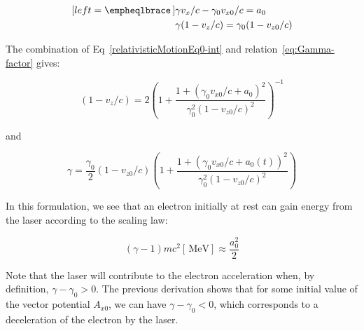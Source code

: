 \begin{subequations}
\label{relativisticMotionEq0-int}
\begin{align}[left = \empheqlbrace\,]
&\gamma v_x/c -\gamma_0 v_{x0}/c = a_0 \label{relativisticMotionEq0-1} \\
&\gamma (1 - v_z/c) =\gamma_0 (1 - v_{z0}/c ) \label{relativisticMotionEq0-3} 
\end{align}
\end{subequations}

\noindent The combination of Eq~\ref{relativisticMotionEq0-int} and relation~\ref{eq:Gamma-factor} gives:



\begin{equation}
(1 -v_z/c) = 2(1 + \frac{1+ (\gamma_0 v_{x0}/c + a_0)^2}{\gamma_0^2(1 - v_{z0}/c )^2})^{-1}
\end{equation}

\noindent and 

\begin{equation}
\gamma = \frac{\gamma_0}{2}(1 - v_{z0}/c )(1 + \frac{1+ (\gamma_0 v_{x0}/c + a_0(t))^2}{\gamma_0^2(1 - v_{z0}/c )^2})
\end{equation}


\noindent In this formulation, we see that an electron initially at rest can gain energy from the laser according to the scaling law:

$$
(\gamma -1)m c^2 [\,\mathrm{MeV}]  \approx  \frac{a_0^2}{2} 
$$

\noindent Note that the laser will contribute to the electron acceleration when, by definition, $\gamma - \gamma_0 > 0$. The previous derivation shows that for some initial value of the vector potential $A_{x0}$, we can have $\gamma - \gamma_0 <0$, which corresponds to a deceleration of the electron by the laser.\\

